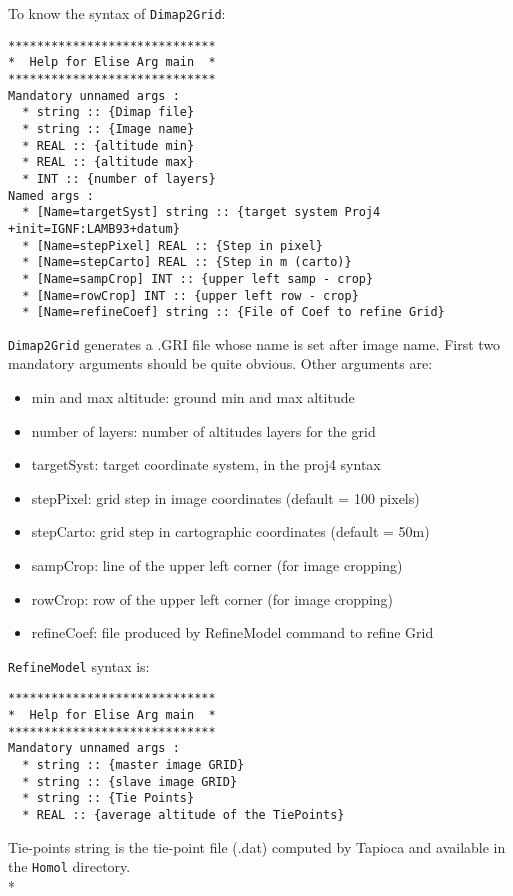 To know the syntax of {\tt Dimap2Grid}:
\begin{verbatim}
*****************************
*  Help for Elise Arg main  *
*****************************
Mandatory unnamed args : 
  * string :: {Dimap file}
  * string :: {Image name}
  * REAL :: {altitude min}
  * REAL :: {altitude max}
  * INT :: {number of layers}
Named args : 
  * [Name=targetSyst] string :: {target system Proj4 +init=IGNF:LAMB93+datum}
  * [Name=stepPixel] REAL :: {Step in pixel}
  * [Name=stepCarto] REAL :: {Step in m (carto)}
  * [Name=sampCrop] INT :: {upper left samp - crop}
  * [Name=rowCrop] INT :: {upper left row - crop}
  * [Name=refineCoef] string :: {File of Coef to refine Grid}
\end{verbatim}

{\tt Dimap2Grid} generates a .GRI file whose name is set after image name.
First two mandatory arguments should be quite obvious. Other arguments are:
\begin{itemize}
\item min and max altitude: ground min and max altitude
\item number of layers: number of altitudes layers for the grid
\item targetSyst: target coordinate system, in the proj4 syntax
\item stepPixel: grid step in image coordinates (default = 100 pixels)
\item stepCarto: grid step in cartographic coordinates (default = 50m)
\item sampCrop: line of the upper left corner (for image cropping)
\item rowCrop: row of the upper left corner (for image cropping)
\item refineCoef: file produced by RefineModel command to refine Grid
\end{itemize}

{\tt RefineModel} syntax is: 

\begin{verbatim}
*****************************
*  Help for Elise Arg main  *
*****************************
Mandatory unnamed args : 
  * string :: {master image GRID}
  * string :: {slave image GRID}
  * string :: {Tie Points}
  * REAL :: {average altitude of the TiePoints}
\end{verbatim}

Tie-points string is the tie-point file (.dat) computed by Tapioca and available in the {\tt Homol} directory.\\*

